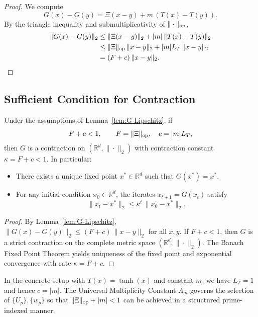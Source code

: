 \documentclass[11pt,letterpaper]{article}
\begin{document}
\begin{proof}
We compute
\[
  G(x) - G(y) = \Xi(x-y) + m\,(T(x) - T(y)).
\]
By the triangle inequality and submultiplicativity of \(\|\cdot\|_{\rm op}\),
\begin{align*}
  \|G(x) - G(y)\|_2
  &\le \|\Xi(x-y)\|_2 + |m|\,\|T(x) - T(y)\|_2 \\
  &\le \|\Xi\|_{\rm op}\,\|x-y\|_2 + |m| L_T\,\|x-y\|_2 \\
  &= (F + c)\,\|x-y\|_2.
\end{align*}
\end{proof}

\subsection{Sufficient Condition for Contraction}

\begin{theorem}
\label{thm:contraction}
Under the assumptions of Lemma~\ref{lem:G-Lipschitz}, if
\begin{equation}
  F + c < 1, \qquad F = \|\Xi\|_{\rm op},\quad c = |m|L_T,
\end{equation}
then \(G\) is a contraction on \((\mathbb{R}^d,\|\cdot\|_2)\) with
contraction constant \(\kappa = F + c < 1\). In particular:

\begin{itemize}[leftmargin=*]
  \item There exists a unique fixed point \(x^\ast\in\mathbb{R}^d\)
        such that \(G(x^\ast) = x^\ast\).
  \item For any initial condition \(x_0\in\mathbb{R}^d\), the iterates
  \(x_{t+1} = G(x_t)\) satisfy
  \[
    \|x_t - x^\ast\|_2 \le \kappa^t\,\|x_0 - x^\ast\|_2.
  \]
\end{itemize}
\end{theorem}

\begin{proof}
By Lemma~\ref{lem:G-Lipschitz},
\(\|G(x)-G(y)\|_2 \le (F + c)\,\|x-y\|_2\) for all \(x,y\).
If \(F + c < 1\), then \(G\) is a strict contraction on the complete
metric space \((\mathbb{R}^d,\|\cdot\|_2)\). The Banach Fixed Point
Theorem yields uniqueness of the fixed point and exponential convergence
with rate \(\kappa = F + c\).
\end{proof}

In the concrete setup with \(T(x) = \tanh(x)\) and constant \(m\),
we have \(L_T = 1\) and hence \(c = |m|\). The Universal Multiplicity
Constant \(\Lambda_m\) governs the selection of \(\{U_p\},\{w_p\}\)
so that \(\|\Xi\|_{\rm op} + |m| < 1\) can be achieved in a structured
prime-indexed manner.
\end{document}
